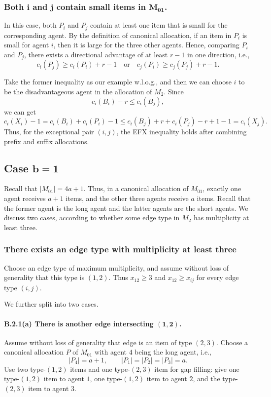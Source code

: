 \documentclass{article}
\theoremstyle{definition}
\begin{document}
\subsubsection{Both $\boldsymbol{i}$ and $\boldsymbol{j}$ contain small items in $\boldsymbol{M_{01}}$.}
In this case, both $P_i$ and $P_j$ contain at least one item that is small for the corresponding agent. By the definition of canonical allocation, if an item in $P_i$ is small for agent $i$, then it is large for the three other agents. Hence, comparing $P_i$ and $P_j$, there exists a directional advantage of at least $r-1$ in one direction, i.e.,
\[
c_i(P_j)\ge c_i(P_i)+r-1
\quad \text{or} \quad
c_j(P_i)\ge c_j(P_j)+r-1.
\]

Take the former inequality as our example w.l.o.g., and then we can choose $i$ to be the disadvantageous agent in the allocation of $M_2$. Since
$$c_{i}(B_{i}) - r \le c_{i}(B_{j}),$$
we can get
$$c_{i}(X_{i}) - 1 = c_{i}(B_{i}) + c_{i}(P_{i})-1 \le c_{i}(B_{j}) + r + c_{i}(P_{j}) -r + 1 - 1 = c_{i}(X_{j}).$$
Thus, for the exceptional pair $(i,j)$, the EFX inequality holds after combining prefix and suffix allocations.

\fi

\subsection{Case $\boldsymbol{b=1}$}
Recall that $|M_{01}|=4a+1$.  Thus, in a canonical allocation of $M_{01}$,
exactly one agent receives $a+1$ items, and the other three agents receive $a$
items.  Recall that the former agent is the long agent and the latter agents are the short agents. We discuss two cases, according to whether some edge type in $M_2$ has multiplicity at least three.

\subsubsection{There exists an edge type with multiplicity at least three}

Choose an edge type of maximum multiplicity, and assume without loss of
generality that this type is $(1,2)$.  Thus $x_{12}\ge 3$ and
$x_{12}\ge x_{ij}$ for every edge type $(i,j)$.

We further split into two cases.
\paragraph{B.2.1(a) There is another edge intersecting $\boldsymbol{(1,2)}$.}
Assume without loss of generality that edge is an item of type $(2,3)$.
Choose a canonical allocation $P$ of $M_{01}$ with agent $4$ being the long
agent, i.e.,
\[
    |P_4|=a+1,\qquad |P_1|=|P_2|=|P_3|=a.
\]
Use two type-$(1,2)$ items and one type-$(2,3)$ item for gap filling: give one
type-$(1,2)$ item to agent $1$, one type-$(1,2)$ item to agent $2$, and the
type-$(2,3)$ item to agent $3$.
\end{document}
